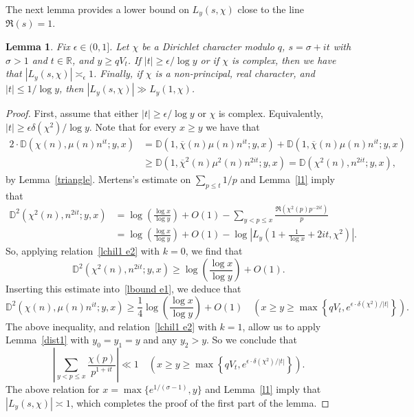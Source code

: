 \documentclass[12pt]{amsart}
\newtheorem{lemma}[theorem]{Lemma}
\theoremstyle{remark}
\newcommand {\SR} {{\mathbb R}}
\newcommand {\SD} {{\mathbb D}}
\newcommand{\bsp}{\begin{split}}
\newcommand{\be}{\begin{equation}}
\newcommand{\ee}{\end{equation}}
\newcommand{\bes}{\begin{equation*}}
\newcommand{\ees}{\end{equation*}}
\numberwithin{equation}{section}
\begin{document}
The next lemma provides a lower bound on $L_y(s,\chi)$ close to the line $\Re(s)=1$.

\begin{lemma}\label{lchil2} Fix $\epsilon\in(0,1]$. Let $\chi$ be a Dirichlet character modulo $q$, $s=\sigma+it$ with $\sigma>1$ and $t\in\SR$, and $y\ge qV_t$. If $|t|\ge\epsilon/\log y$ or if $\chi$ is complex, then we have that $|L_y(s,\chi)|\asymp_\epsilon1$. Finally, if $\chi$ is a non-principal, real character, and $|t|\le1/\log y$, then $|L_y(s,\chi)|\gg L_y(1,\chi)$.
\end{lemma}

\begin{proof} First, assume that either $|t|\ge\epsilon/\log y$ or $\chi$ is complex. Equivalently, $|t|\ge\epsilon \delta(\chi^2)/\log y$. Note that for every $x\ge y$ we have that
\be\label{lbound e1}\bsp
2\cdot\SD(\chi(n),\mu(n)n^{it};y,x)&=\SD(1,\overline{\chi}(n)\mu(n)n^{it};y,x) + \SD(1,\overline{\chi}(n)\mu(n)n^{it};y,x)\\
&\ge\SD(1,\overline{\chi}^2(n)\mu^2(n)n^{2it};y,x)=\SD(\chi^2(n),n^{2it};y,x),
\end{split}\ee
by Lemma~\ref{triangle}. Mertens's estimate on $\sum_{p\le t}1/p$ and Lemma~\ref{l1} imply that
\bes\bsp
\SD^2(\chi^2(n),n^{2it};y,x)&=\log\left(\frac{\log x}{\log y}\right)+O(1)-\sum_{y<p\le x}\frac{\Re(\chi^2(p)p^{-2it})}p\\
&= \log\left(\frac{\log x}{\log y}\right)+O(1)-\log\left|L_y\left(1+\frac1{\log x}+2it,\chi^2\right)\right|.
\end{split}\ees
So, applying relation~\eqref{lchil1 e2} with $k=0$, we find that
$$
\SD^2(\chi^2(n),n^{2it};y,x)\ge\log\left(\frac{\log x}{\log y}\right)+O(1).
$$
Inserting this estimate into~\eqref{lbound e1}, we deduce that
$$
\SD^2(\chi(n),\mu(n)n^{it};y,x)\ge\frac14\log\left(\frac{\log x}{\log y}\right)+O(1)\quad\left(x\ge y\ge\max\left\{qV_t,e^{\epsilon\cdot\delta(\chi^2)/|t|}\right\}\right).
$$
The above inequality, and relation~\eqref{lchil1 e2} with $k=1$, allow us to apply Lemma~\ref{dist1} with $y_0=y_1=y$ and any $y_2>y$. So we conclude that
\be\label{lchie1}
\left|\sum_{y<p\le x}\frac{\chi(p)}{p^{1+it}}\right|\ll1 \quad\left(x\ge y\ge\max\left\{qV_t,e^{\epsilon\cdot\delta(\chi^2)/|t|}\right\}\right).
\ee
The above relation for $x=\max\{e^{1/(\sigma-1)},y\}$ and Lemma~\ref{l1} imply that $|L_y(s,\chi)|\asymp1$, which completes the proof of the first part of the lemma.


\end{proof}
\end{document}
